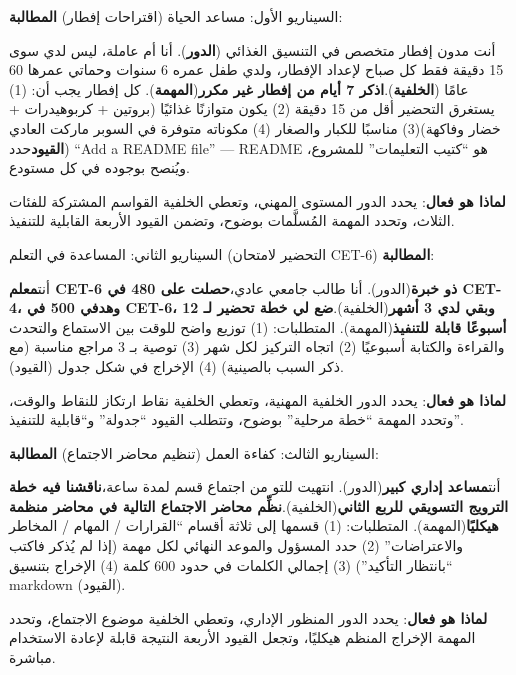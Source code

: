 \begin{tcbinfo}{السيناريو الأول: مساعد الحياة (اقتراحات إفطار)}
\textbf{المطالبة}:

أنت مدون إفطار متخصص في التنسيق الغذائي (\textbf{الدور}). أنا أم عاملة، ليس لدي سوى 15 دقيقة فقط كل صباح لإعداد الإفطار، ولدي طفل عمره 6 سنوات وحماتي عمرها 60 عامًا (\textbf{الخلفية}).\textbf{اذكر 7 أيام من إفطار غير مكرر}(\textbf{المهمة}). كل إفطار يجب أن: (1) يستغرق التحضير أقل من 15 دقيقة (2) يكون متوازنًا غذائيًا (بروتين + كربوهيدرات + خضار وفاكهة)(3) مناسبًا للكبار والصغار (4) مكوناته متوفرة في السوبر ماركت العادي (\textbf{القيود}حدد “Add a README file” — README هو “كتيب التعليمات” للمشروع، ويُنصح بوجوده في كل مستودع.

\textbf{لماذا هو فعال}: يحدد الدور المستوى المهني، وتعطي الخلفية القواسم المشتركة للفئات الثلاث، وتحدد المهمة المُسلَّمات بوضوح، وتضمن القيود الأربعة القابلية للتنفيذ.

\end{tcbinfo}

\begin{tcbinfo}{السيناريو الثاني: المساعدة في التعلم (التحضير لامتحان CET-6)}
\textbf{المطالبة}:

أنت\textbf{معلم CET-6 ذو خبرة}(الدور). أنا طالب جامعي عادي،\textbf{حصلت على 480 في CET-4، وهدفي 500 في CET-6، وبقي لدي 3 أشهر}(الخلفية).\textbf{ضع لي خطة تحضير لـ 12 أسبوعًا قابلة للتنفيذ}(المهمة). المتطلبات: (1) توزيع واضح للوقت بين الاستماع والتحدث والقراءة والكتابة أسبوعيًا (2) اتجاه التركيز لكل شهر (3) توصية بـ 3 مراجع مناسبة (مع ذكر السبب بالصينية) (4) الإخراج في شكل جدول (القيود).

\textbf{لماذا هو فعال}: يحدد الدور الخلفية المهنية، وتعطي الخلفية نقاط ارتكاز للنقاط والوقت، وتحدد المهمة “خطة مرحلية” بوضوح، وتتطلب القيود “جدولة” و“قابلية للتنفيذ”.

\end{tcbinfo}

\begin{tcbinfo}{السيناريو الثالث: كفاءة العمل (تنظيم محاضر الاجتماع)}
\textbf{المطالبة}:

أنت\textbf{مساعد إداري كبير}(الدور). انتهيت للتو من اجتماع قسم لمدة ساعة،\textbf{ناقشنا فيه خطة الترويج التسويقي للربع الثاني}(الخلفية).\textbf{نظِّم محاضر الاجتماع التالية في محاضر منظمة هيكليًا}(المهمة). المتطلبات: (1) قسمها إلى ثلاثة أقسام “القرارات / المهام / المخاطر والاعتراضات” (2) حدد المسؤول والموعد النهائي لكل مهمة (إذا لم يُذكر فاكتب “بانتظار التأكيد”) (3) إجمالي الكلمات في حدود 600 كلمة (4) الإخراج بتنسيق markdown (القيود).

\textbf{لماذا هو فعال}: يحدد الدور المنظور الإداري، وتعطي الخلفية موضوع الاجتماع، وتحدد المهمة الإخراج المنظم هيكليًا، وتجعل القيود الأربعة النتيجة قابلة لإعادة الاستخدام مباشرة.

\end{tcbinfo}

